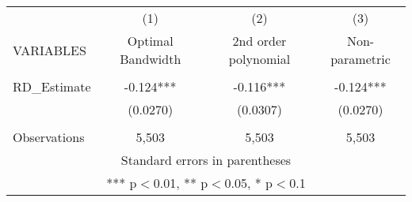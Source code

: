 \documentclass[]{article}
\begin{document}
\begin{tabular}{lccc} \hline
 & (1) & (2) & (3) \\
VARIABLES & Optimal Bandwidth & 2nd order polynomial & Non-parametric \\ \hline
 &  &  &  \\
RD\_Estimate & -0.124*** & -0.116*** & -0.124*** \\
 & (0.0270) & (0.0307) & (0.0270) \\
 &  &  &  \\
 Observations & 5,503 & 5,503 & 5,503 \\ \hline
\multicolumn{4}{c}{ Standard errors in parentheses} \\
\multicolumn{4}{c}{ *** p$<$0.01, ** p$<$0.05, * p$<$0.1} \\
\end{tabular}
\end{document}
